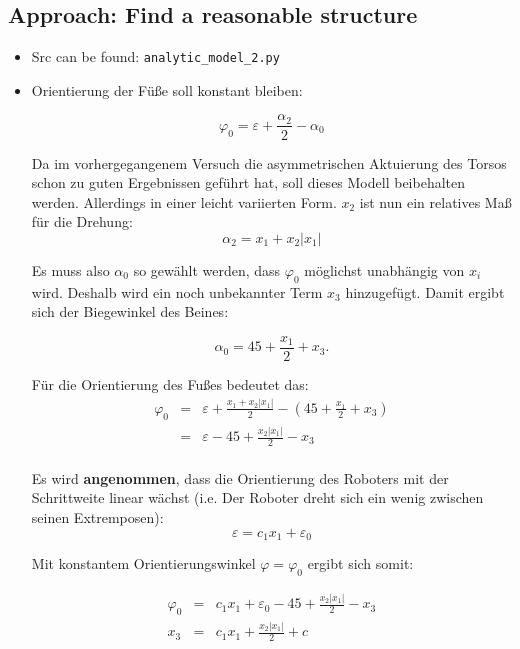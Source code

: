 \documentclass[10pt,a4paper]{article}
\begin{document}
\subsection{Approach: Find a reasonable structure}

\begin{itemize}

\item Src can be found: \texttt{analytic\_model\_2.py}

\item Orientierung der Füße soll konstant bleiben:

\begin{equation}
\varphi_0 = \varepsilon + \frac{\alpha_2}{2} - \alpha_0
\end{equation}

Da im vorhergegangenem Versuch die asymmetrischen Aktuierung des Torsos schon zu guten Ergebnissen geführt hat, soll dieses Modell beibehalten werden. Allerdings in einer leicht variierten Form. $x_2$ ist nun ein relatives Maß für die Drehung:
\begin{equation}
\alpha_2 = x_1 + x_2|x_1|
\end{equation}


Es muss also $\alpha_0$ so gewählt werden, dass $\varphi_0$ möglichst unabhängig von $x_i$ wird.
Deshalb wird ein noch unbekannter Term $x_3$ hinzugefügt. Damit ergibt sich der Biegewinkel des Beines:

\begin{equation}
\alpha_0 = 45+ \frac{x_1}{2} + x_3.
\end{equation}

Für die Orientierung des Fußes bedeutet das:
\begin{eqnarray}
\varphi_0 &=& \varepsilon + \frac{x_1 + x_2|x_1|}{2} - \left( 45 + \frac{x_1}{2} + x_3 \right) \\
			&=& \varepsilon -45 + \frac{x_2|x_1|}{2} -x_3 \\
\end{eqnarray}

Es wird \textbf{angenommen}, dass die Orientierung des Roboters mit der Schrittweite linear wächst (i.e. Der Roboter dreht sich ein wenig zwischen seinen Extremposen):
\begin{equation}
\varepsilon = c_1 x_1 + \varepsilon_0
\end{equation}

Mit konstantem Orientierungswinkel $\varphi = \varphi_0$ ergibt sich somit:

\begin{eqnarray}
\varphi_0 &=& c_1 x_1 + \varepsilon_0 - 45 + \frac{x_2|x_1|}{2} -x_3 \\
x_3 &=&  c_1 x_1 + \frac{x_2|x_1|}{2} + c
\end{eqnarray}


\end{itemize}
\end{document}
